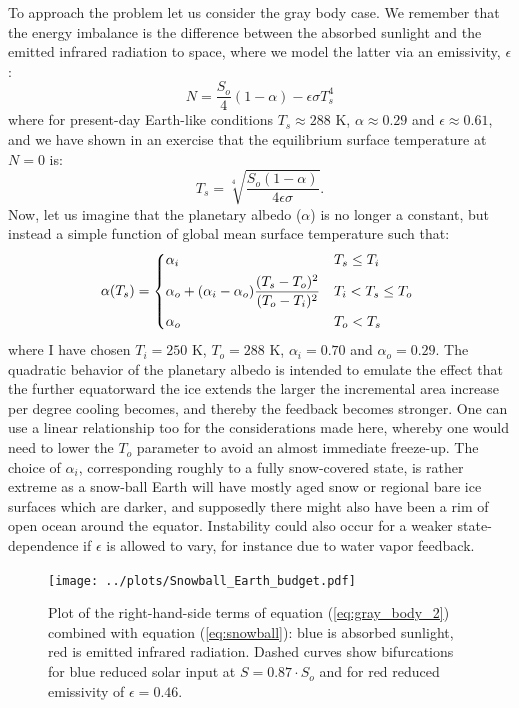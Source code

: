\documentclass[12pt]{book}
\begin{document}
To approach the problem let us consider the gray body case. We remember that the energy imbalance is the difference between the absorbed sunlight and the emitted infrared radiation to space, where we model the latter via an emissivity, $\epsilon$:
\begin{equation}
N = \frac{S_o}{4}(1-\alpha) - \epsilon \sigma T_s^4
\label{eq:gray_body_2}
\end{equation}
where for present-day Earth-like conditions $T_s\approx 288$ K, $\alpha \approx 0.29$ and $\epsilon \approx 0.61$, and we have shown in an exercise that the equilibrium surface temperature at $N=0$ is:
$$T_s = \sqrt[4]{\frac{S_o(1-\alpha)}{4\epsilon\sigma}}.$$
Now, let us imagine that the planetary albedo ($\alpha$) is no longer a constant, but instead a simple function of global mean surface temperature such that:
\begin{equation}
\alpha(T_s) = 
\begin{dcases*}
   \alpha_i                    & $T_s \le T_i$  \\
   \alpha_o+(\alpha_i-\alpha_o)\frac{(T_s-T_o)^2}{(T_o-T_i)^2}       & $T_i < T_s \le T_o$ \\
   \alpha_o                    & $T_o < T_s$ 
\end{dcases*}
\label{eq:snowball}
\end{equation}
where I have chosen $T_i=250$ K, $T_o=288$ K, $\alpha_i=0.70$ and $\alpha_o=0.29$. The quadratic behavior of the planetary albedo is intended to emulate the effect that the further equatorward the ice extends the larger the incremental area increase per degree cooling becomes, and thereby the feedback becomes stronger. One can use a linear relationship too for the considerations made here, whereby one would need to lower the $T_o$ parameter to avoid an almost immediate freeze-up. The choice of $\alpha_i$, corresponding roughly to a fully snow-covered state, is rather extreme as a snow-ball Earth will have mostly aged snow or regional bare ice surfaces which are darker, and supposedly there might also have been a rim of open ocean around the equator. Instability could also occur for a weaker state-dependence if $\epsilon$ is allowed to vary, for instance due to water vapor feedback.

\begin{figure}
\begin{center}
\texttt{[image: ../plots/Snowball\_Earth\_budget.pdf]}
\end{center}
\caption{ Plot of the right-hand-side terms of equation (\ref{eq:gray_body_2}) combined with equation (\ref{eq:snowball}): blue is absorbed sunlight, red is emitted infrared radiation. Dashed curves show bifurcations for blue reduced solar input at $S=0.87\cdot S_o$ and for red reduced emissivity of $\epsilon=0.46$. } 
\label{fig:snowball}
\end{figure}
\end{document}
